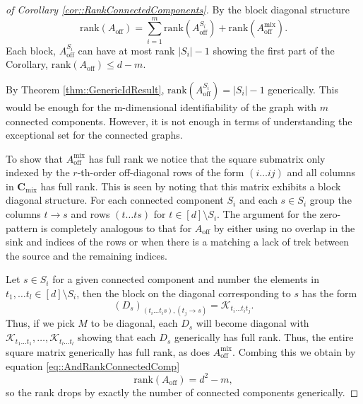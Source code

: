 \documentclass{biometrika}
\begin{document}
\begin{proof}[ of Corollary \ref{cor::RankConnectedComponents}]
By the block diagonal structure 
\begin{equation}
\label{eq::AndRankConnectedComp}
    \mathrm{rank} \left(A_{\mathrm{off}} \right) = \sum_{i = 1}^m\mathrm{rank} \left(A^{S_i}_{\mathrm{off}} \right) + \mathrm{rank} \left(A^{\mathrm{mix}}_{\mathrm{off}} \right).
\end{equation}
Each block, $A^{S_i}_{\mathrm{off}}$ can have at most rank  $|S_i| -1$ showing the first part of the Corollary, $\mathrm{rank} \left(A_{\mathrm{off}} \right) \leq d-m.$


By Theorem \ref{thm::GenericIdResult}, $\mathrm{rank}(A^{S_i}_{\mathrm{off}}) = |S_i| -1$ generically. This would be enough for the m-dimensional identifiability of the graph with $m$ connected components. However, it is not enough in terms of understanding the exceptional set for the connected graphs. 

To show that $A^{\mathrm{mix}}_{\mathrm{off}}$ has full rank we notice that the square submatrix only indexed by the $r$-th-order off-diagonal rows of the form $(i \dots ij)$ and all columns in $\mathbf{C}_{\mathrm{mix}}$ has full rank. This is seen by noting that this matrix exhibits a block diagonal structure. For each connected component $S_i$ and each $s \in S_i$ group the columns $t \rightarrow s$ and rows $(t \dots t s)$ for $t \in [d] \setminus S_i$. The argument for the zero-pattern is completely analogous to that for $A_{\mathrm{off}}$ by either using no overlap in the sink and indices of the rows or when there is a matching a lack of trek between the source and the remaining indices. 

Let $s \in S_i$ for a given connected component and number the elements in $t_1, \dots t_l \in [d] \setminus S_i$, then the block on the diagonal corresponding to $s$ has the form 
\begin{equation*}
    (D_s)_{(t_i \dots t_i s), (t_j \rightarrow s)} = \mathcal{K} _{t_i \dots t_i t_j}. 
\end{equation*}
Thus, if we pick $M$ to be diagonal, each $D_s$ will become diagonal with $\mathcal{K} _{t_1 \dots t_1}, \dots, \mathcal{K} _{t_l \dots t_l}$ showing that each $D_s$ generically has full rank. Thus, the entire square matrix generically has full rank, as does $A^{\mathrm{mix}}_{\mathrm{off}}$. 
Combing this we obtain by equation \eqref{eq::AndRankConnectedComp}
\begin{equation*}
     \mathrm{rank}(A_{\mathrm{off}}) = d^2 - m,
\end{equation*}
so the rank drops by exactly the number of connected components generically. 
\end{proof}
\end{document}
